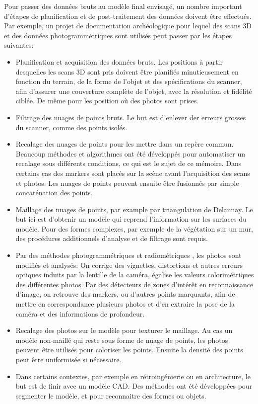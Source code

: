 \documentclass[a4paper,10pt]{scrreprt}
\begin{document}
Pour passer des données bruts au modèle final envisagé, un nombre important d'étapes de planification et de post-traitement des données doivent être effectués. Par exemple, un projet de documentation archéologique pour lequel des scans 3D et des données photogrammétriques sont utilisés peut passer par les étapes suivantes: \cite{Lerm2009}
\begin{itemize}
	\item Planification et acquisition des données bruts. Les positions à partir desquelles les scans 3D sont pris doivent être planifiés minutieusement en fonction du terrain, de la forme de l'objet et des spécifications du scanner, afin d'assurer une couverture complète de l'objet, avec la résolution et fidélité ciblée. De même pour les position où des photos sont prises.
	\item Filtrage des nuages de points bruts. Le but est d'enlever der erreurs grosses du scanner, comme des points isolés.
	\item Recalage des nuages de points pour les mettre dans un repère commun. Beaucoup méthodes et algorithmes ont été développés pour automatiser un recalage sous différents conditions, ce qui est le sujet de ce mémoire. Dans certains cas des markers sont placés sur la scène avant l'acquisition des scans et photos. Les nuages de points peuvent ensuite être fusionnés par simple concaténation des points.
	\item Maillage des nuages de points, par example par triangulation de Delaunay. Le but ici est d'obtenir un modèle qui reprend l'information sur les surfaces du modèle. Pour des formes complexes, par exemple de la végétation sur un mur, des procédures additionnels d'analyse et de filtrage sont requis.
	\item Par des méthodes photogrammétriques \cite{Tour2009} et radiométriques \cite{Giro2013}, les photos sont modifiés et analysés: On corrige des vignettes, distortions et autres erreurs optiques induits par la lentille de la caméra, égalise les valeurs colorimétriques des différentes photos. Par des détecteurs de zones d'intérêt en reconnaissance d'image, on retrouve des markers, ou d'autres points marquants, afin de mettre en correspondance plusieurs photos et d'en extraire la pose de la caméra et des informations de profondeur.
	\item Recalage des photos sur le modèle pour texturer le maillage. Au cas un modèle non-maillé qui reste sous forme de nuage de points, les photos peuvent être utilisés pour coloriser les points. Ensuite la densité des points peut être uniformisée si nécessaire.
	\item Dans certains contextes, par exemple en rétroingénierie ou en architecture, le but est de finir avec un modèle CAD. Des méthodes ont été développées pour segmenter le modèle, et pour reconnaitre des formes ou objets.
\end{itemize}
\end{document}
